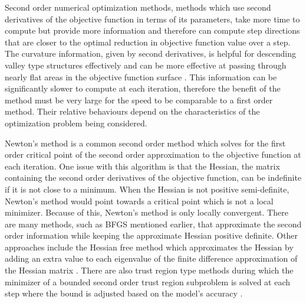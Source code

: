 \documentclass[letterpaper,12pt,titlepage,oneside,final]{book}
\begin{document}
	Second order numerical optimization methods, methods which use second derivatives of the objective function in terms of its parameters, take more time to compute but provide more information and therefore can compute step directions that are closer to the optimal reduction in objective function value over a step. The curvature information, given by second derivatives, is helpful for descending valley type structures effectively and can be more effective at passing through nearly flat areas in the objective function surface \cite{Shepherd.1997}. This information can be significantly slower to compute at each iteration, therefore the benefit of the method must be very large for the speed to be comparable to a first order method. Their relative behaviours depend on the characteristics of the optimization problem being considered. 
	
	Newton's method is a common second order method which solves for the first order critical point of the second order approximation to the objective function at each iteration. One issue with this algorithm is that the Hessian, the matrix containing the second order derivatives of the objective function, can be indefinite if it is not close to a minimum. When the Hessian is not positive semi-definite, Newton's method would point towards a critical point which is not a local minimizer. Because of this, Newton's method is only locally convergent. There are many methods, such as BFGS mentioned earlier, that approximate the second order information while keeping the approximate Hessian positive definite. Other approaches include the Hessian free method which approximates the Hessian by adding an extra value to each eigenvalue of the finite difference approximation of the Hessian matrix \cite{martens2010deep}. There are also trust region type methods during which the minimizer of a bounded second order trust region subproblem is solved at each step where the bound is adjusted based on the model's accuracy \cite{wright1999numerical}. 
	
\end{document}
